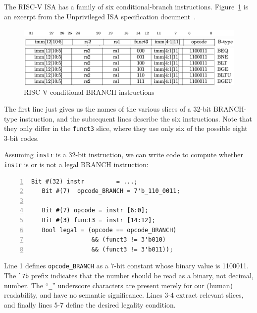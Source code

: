 The RISC-V ISA has a family of six conditional-branch instructions.
Figure~\ref{Fig_Combo_BRANCH_instrs} is an excerpt from the Unprivileged ISA
specification document~\cite{RISCV_Unpriv_2019_12_13}.
\begin{figure}[htbp]
  \centerline{\includegraphics[width=6in,angle=0]{Figures/Fig_Combo_BRANCH_instrs_1}}
  \centerline{\includegraphics[width=6in,angle=0]{Figures/Fig_Combo_BRANCH_instrs_2}}
  \vspace{2mm}
  \centerline{\includegraphics[width=6in,angle=0]{Figures/Fig_Combo_BRANCH_instrs_3}}
  \caption{\label{Fig_Combo_BRANCH_instrs}RISC-V conditional BRANCH instructions}
\end{figure}
The first line just gives us the names of the various slices of a
32-bit BRANCH-type instruction, and the subsequent lines describe the
six instructions.  Note that they only differ in the \verb|funct3|
slice, where they use only six of the possible eight 3-bit codes.

Assuming \verb|instr| is a 32-bit instruction, we can write {\BSV} code
to compute whether \verb|instr| is or is not a legal BRANCH
instruction:

{\footnotesize
\begin{Verbatim}[frame=single, numbers=left]
   Bit #(32) instr         = ...;
   Bit #(7)  opcode_BRANCH = 7'b_110_0011;

   Bit #(7) opcode = instr [6:0];
   Bit #(3) funct3 = instr [14:12];
   Bool legal = (opcode == opcode_BRANCH)
                 && (funct3 != 3'b010)
                 && (funct3 != 3'b011));
\end{Verbatim}
}

Line 1 defines \verb|opcode_BRANCH| as a 7-bit constant whose binary
value is 1100011.  The \verb|`7b| prefix indicates that the number
should be read as a binary, not decimal, number.  The ``\verb|_|''
underscore characters are present merely for our (human) readability,
and have no semantic significance.  Lines 3-4 extract relevant slices,
and finally lines 5-7 define the desired legality condition.

